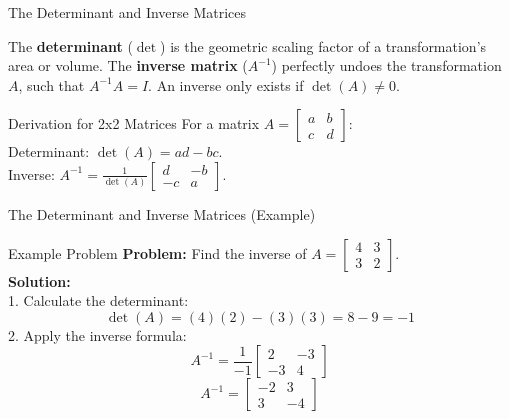 \documentclass[10pt, aspectratio=169]{beamer}
\begin{document}
\begin{frame}{The Determinant and Inverse Matrices}
    \begin{definition}
        The \textbf{determinant} ($\det$) is the geometric scaling factor of a transformation's area or volume. The \textbf{inverse matrix} ($A^{-1}$) perfectly undoes the transformation $A$, such that $A^{-1}A = I$. An inverse only exists if $\det(A) \neq 0$.
    \end{definition}

    \begin{block}{Derivation for 2x2 Matrices}
        For a matrix $A = \begin{bmatrix} a & b \\ c & d \end{bmatrix}$: \\
        Determinant: $\det(A) = ad - bc$. \\
        Inverse: $A^{-1} = \frac{1}{\det(A)} \begin{bmatrix} d & -b \\ -c & a \end{bmatrix}$.
    \end{block}
\end{frame}

\begin{frame}{The Determinant and Inverse Matrices (Example)}
    \begin{exampleblock}{Example Problem}
        \textbf{Problem:} Find the inverse of $A = \begin{bmatrix} 4 & 3 \\ 3 & 2 \end{bmatrix}$. \\
        \vspace{0.5cm}
        \textbf{Solution:} \\
        1. Calculate the determinant:
        $$\det(A) = (4)(2) - (3)(3) = 8 - 9 = -1$$
        2. Apply the inverse formula:
        $$A^{-1} = \frac{1}{-1} \begin{bmatrix} 2 & -3 \\ -3 & 4 \end{bmatrix}$$
        $$A^{-1} = \begin{bmatrix} -2 & 3 \\ 3 & -4 \end{bmatrix}$$
    \end{exampleblock}
\end{frame}
\end{document}
